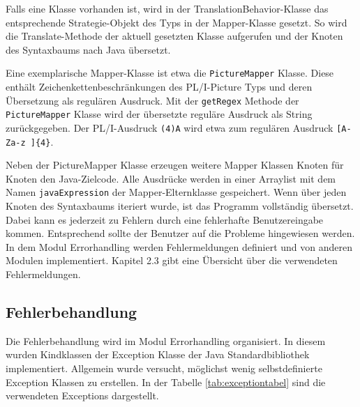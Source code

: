Falls eine Klasse vorhanden ist, wird in der TranslationBehavior-Klasse das entsprechende Strategie-Objekt des Typs  in der
Mapper-Klasse gesetzt. So wird die Translate-Methode der aktuell gesetzten Klasse aufgerufen und der Knoten des Syntaxbaums nach Java übersetzt.

Eine exemplarische Mapper-Klasse ist etwa die \verb+PictureMapper+ Klasse. Diese enthält Zeichenkettenbeschränkungen des PL/I-Picture Typs und deren Übersetzung als regulären Ausdruck.
Mit der \verb+getRegex+ Methode der \verb+PictureMapper+ Klasse wird der übersetzte reguläre Ausdruck als String zurückgegeben.
Der PL/I-Ausdruck \verb+(4)A+ wird etwa zum regulären Ausdruck \verb+[A-Za-z ]{4}+.   

Neben der PictureMapper Klasse erzeugen weitere Mapper Klassen Knoten für Knoten den Java-Zielcode. 
Alle Ausdrücke werden in einer Arraylist mit dem Namen \verb+javaExpression+ der Mapper-Elternklasse  gespeichert.
Wenn über jeden Knoten des Syntaxbaums iteriert wurde, ist das Programm vollständig übersetzt. Dabei kann es jederzeit zu Fehlern durch eine fehlerhafte Benutzereingabe kommen.
Entsprechend sollte der Benutzer auf die Probleme hingewiesen werden.
In dem Modul Errorhandling werden Fehlermeldungen definiert und von anderen Modulen implementiert. Kapitel 2.3 gibt eine Übersicht über die verwendeten Fehlermeldungen.

\pagebreak

\subsection{Fehlerbehandlung}
Die Fehlerbehandlung wird im Modul Errorhandling organisiert.
In diesem wurden Kindklassen der Exception Klasse der Java Standardbibliothek implementiert.
Allgemein wurde versucht, möglichst wenig selbstdefinierte Exception Klassen zu erstellen.
In der Tabelle \ref{tab:exceptiontabel} sind die verwendeten Exceptions dargestellt.

